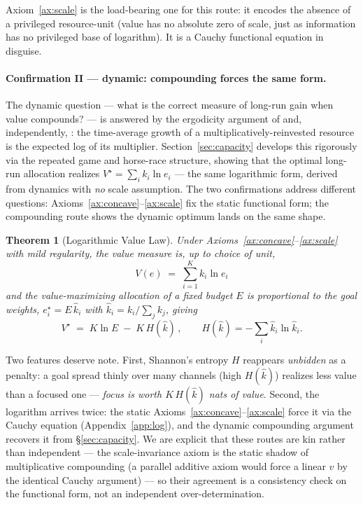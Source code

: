 \documentclass[11pt]{article}
\theoremstyle{plain}
\newtheorem{theorem}{Theorem}
\theoremstyle{definition}
\theoremstyle{remark}
\begin{document}
Axiom~\ref{ax:scale} is the load-bearing one for this route: it encodes the absence of a privileged
resource-unit (value has no absolute zero of scale, just as information has no privileged base of logarithm).
It is a Cauchy functional equation in disguise.

\paragraph{Confirmation II --- dynamic: compounding forces the same form.}
The dynamic question --- what is the correct measure of long-run gain when value compounds? --- is answered
by the ergodicity argument of \citet{peters2019} and, independently, \citet{kelly1956}: the time-average
growth of a multiplicatively-reinvested resource is the expected log of its multiplier. Section~\ref{sec:capacity}
develops this rigorously via the repeated game and horse-race structure, showing that the optimal long-run
allocation realizes $V^\star=\sum_i k_i\ln e_i$ --- the same logarithmic form, derived from dynamics with
\emph{no} scale assumption. The two confirmations address different questions: Axioms~\ref{ax:concave}--\ref{ax:scale}
fix the static functional form; the compounding route shows the dynamic optimum lands on the same shape.

\begin{theorem}[Logarithmic Value Law]\label{thm:log}
Under Axioms~\textup{\ref{ax:concave}--\ref{ax:scale}} with mild regularity, the value measure is, up to choice
of unit,
\begin{equation}
\boxed{\;V(e)\;=\;\sum_{i=1}^{K} k_i \ln e_i\;}
\end{equation}
and the value-maximizing allocation of a fixed budget $E$ is proportional to the goal weights,
$e_i^\star = E\,\hat k_i$ with $\hat k_i=k_i/\sum_j k_j$, giving
\begin{equation}
V^\star \;=\; K\ln E \;-\; K\, H(\hat k)\,,\qquad H(\hat k)=-\textstyle\sum_i \hat k_i\ln\hat k_i .
\end{equation}
\end{theorem}
\noindent Two features deserve note. First, Shannon's entropy $H$ reappears \emph{unbidden} as a penalty: a goal
spread thinly over many channels (high $H(\hat k)$) realizes less value than a focused one ---
\emph{focus is worth $K\,H(\hat k)$ nats of value}. Second, the logarithm arrives twice: the static
Axioms~\ref{ax:concave}--\ref{ax:scale} force it via the Cauchy equation (Appendix~\ref{app:log}), and
the dynamic compounding argument recovers it from \S\ref{sec:capacity}. We are explicit that these routes are
kin rather than independent --- the scale-invariance axiom is the static shadow of multiplicative compounding
(a parallel additive axiom would force a linear $v$ by the identical Cauchy argument) --- so their agreement
is a consistency check on the functional form, not an independent over-determination.
\end{document}

